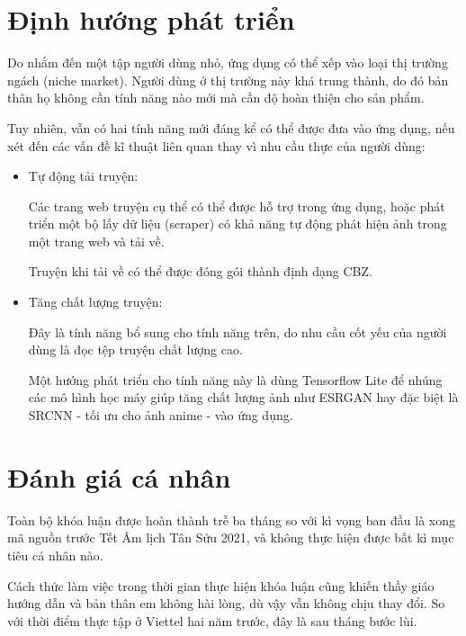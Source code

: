 \documentclass[../../thesis]{subfiles}
\begin{document}
\section{Định hướng phát triển}\label{sec:future-work}

Do nhắm đến một tập người dùng nhỏ, ứng dụng có thể xếp vào loại thị trường
ngách (niche market). Người dùng ở thị trường này khá trung thành, do đó bản
thân họ không cần tính năng nào mới mà cần độ hoàn thiện cho sản phẩm.

Tuy nhiên, vẫn có hai tính năng mới đáng kể có thể được đưa vào ứng dụng, nếu
xét đến các vấn đề kĩ thuật liên quan thay vì nhu cầu thực của người dùng:

\begin{itemize}
    \item
        Tự động tải truyện:

        Các trang web truyện cụ thể có thể được hỗ trợ trong ứng dụng, hoặc phát
        triển một bộ lấy dữ liệu (scraper) có khả năng tự động phát hiện ảnh
        trong một trang web và tải về.

        Truyện khi tải về có thể được đóng gói thành định dạng CBZ.
    \item
        Tăng chất lượng truyện:

        Đây là tính năng bổ sung cho tính năng trên, do nhu cầu cốt yếu của
        người dùng là đọc tệp truyện chất lượng cao.

        Một hướng phát triển cho tính năng này là dùng Tensorflow Lite để nhúng
        các mô hình học máy giúp tăng chất lượng ảnh như ESRGAN hay đặc biệt là
        SRCNN - tối ưu cho ảnh anime - vào ứng dụng.
\end{itemize}

\section{Đánh giá cá nhân}\label{sec:personal-assessment}

Toàn bộ khóa luận được hoàn thành trễ ba tháng so với kì vọng ban đầu là xong mã
nguồn trước Tết Âm lịch Tân Sửu 2021, và không thực hiện được bất kì mục tiêu cá
nhân nào.

Cách thức làm việc trong thời gian thực hiện khóa luận cũng khiến thầy giáo
hướng dẫn và bản thân em không hài lòng, dù vậy vẫn không chịu thay đổi. So với
thời điểm thực tập ở Viettel hai năm trước, đây là sau tháng bước lùi.
\end{document}
